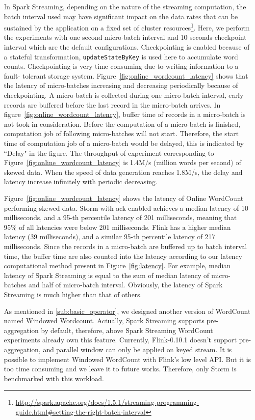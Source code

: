 In Spark Streaming, depending on the nature of the streaming computation, the batch interval used may have significant impact on the data rates that can be sustained by the application on a fixed set of cluster resources\footnote{\url{http://spark.apache.org/docs/1.5.1/streaming-programming-guide.html\#setting-the-right-batch-interval}}. Here, we perform the experiments with one second micro-batch interval and 10 seconds checkpoint interval which are the default configurations. Checkpointing is enabled because of a stateful transformation, \texttt{updateStateByKey} is used here to accumulate word counts.  Checkpointing is very time consuming due to writing information to a fault- tolerant storage system. Figure~\ref{fig:online_wordcount_latency} shows that the latency of micro-batches increasing and decreasing periodically because of checkpointing. A micro-batch is collected during one micro-batch interval, early records are buffered before the last record in the micro-batch arrives. In figure~\ref{fig:online_wordcount_latency}, buffer time of records in a micro-batch is not took in consideration. Before the computation of a micro-batch is finished, computation job of following micro-batches will not start. Therefore, the start time of computation job of a micro-batch would be delayed, this is indicated by ``Delay" in the figure. The throughput of experiment corresponding to Figure~\ref{fig:online_wordcount_latency} is 1.4M/s (million words per second) of skewed data. When the speed of data generation reaches 1.8M/s, the delay and latency increase infinitely with periodic decreasing.

Figure~\ref{fig:online_wordcount_latency} shows the latency of Online WordCount performing skewed data. Storm with ack enabled achieves a median latency of 10 milliseconds, and a 95-th percentile latency of 201 milliseconds, meaning that 95\% of all latencies were below 201 milliseconds. Flink has a higher median latency (39 milliseconds), and a similar 95-th percentile latency of 217 milliseconds. Since the records  in a micro-batch are buffered up to batch interval time, the buffer time are also counted into the latency according to our latency computational method present in Figure~\ref{fig:latency}. For example, median latency of Spark Streaming is equal to the sum of median latency of micro-batches and half of micro-batch interval. Obviously, the latency of Spark Streaming is much higher than that of others.


As mentioned in \cref{sub:basic_operator}, we designed another version of WordCount named Windowed Wordcount. Actually, Spark Streaming supports pre-aggregation by default, therefore, above Spark Streaming WordCount experiments already own this feature. Currently, Flink-0.10.1 doesn't support pre-aggregation, and parallel window can only be applied on keyed stream. It is possible to implement Windowed WordCount with Flink's low level API. But it is too time consuming and we leave it to future works. Therefore, only Storm is benchmarked with this workload.

